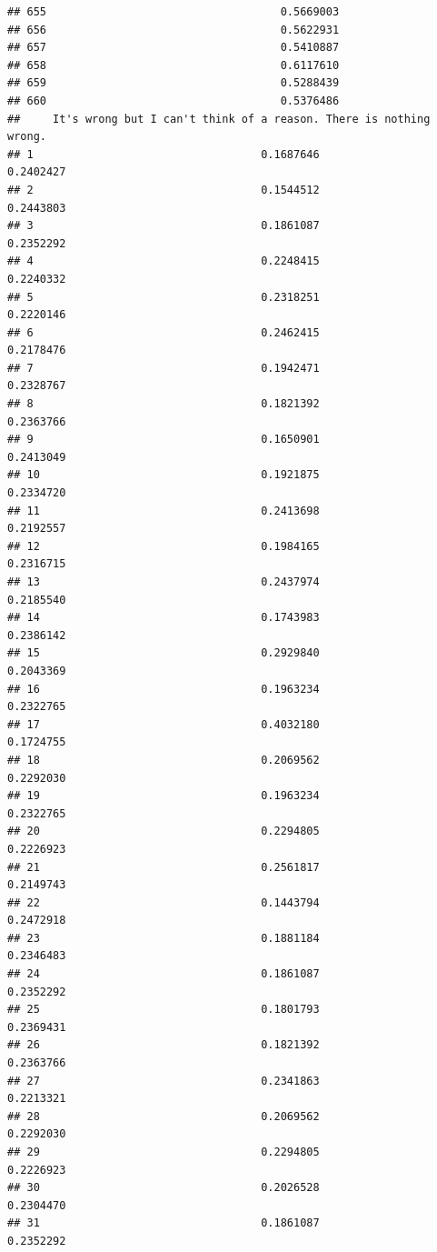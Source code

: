 \documentclass[
  american,
  man,floatsintext]{apa7}
\begin{document}
\begin{verbatim}
## 655                                    0.5669003
## 656                                    0.5622931
## 657                                    0.5410887
## 658                                    0.6117610
## 659                                    0.5288439
## 660                                    0.5376486
##     It's wrong but I can't think of a reason. There is nothing wrong.
## 1                                   0.1687646               0.2402427
## 2                                   0.1544512               0.2443803
## 3                                   0.1861087               0.2352292
## 4                                   0.2248415               0.2240332
## 5                                   0.2318251               0.2220146
## 6                                   0.2462415               0.2178476
## 7                                   0.1942471               0.2328767
## 8                                   0.1821392               0.2363766
## 9                                   0.1650901               0.2413049
## 10                                  0.1921875               0.2334720
## 11                                  0.2413698               0.2192557
## 12                                  0.1984165               0.2316715
## 13                                  0.2437974               0.2185540
## 14                                  0.1743983               0.2386142
## 15                                  0.2929840               0.2043369
## 16                                  0.1963234               0.2322765
## 17                                  0.4032180               0.1724755
## 18                                  0.2069562               0.2292030
## 19                                  0.1963234               0.2322765
## 20                                  0.2294805               0.2226923
## 21                                  0.2561817               0.2149743
## 22                                  0.1443794               0.2472918
## 23                                  0.1881184               0.2346483
## 24                                  0.1861087               0.2352292
## 25                                  0.1801793               0.2369431
## 26                                  0.1821392               0.2363766
## 27                                  0.2341863               0.2213321
## 28                                  0.2069562               0.2292030
## 29                                  0.2294805               0.2226923
## 30                                  0.2026528               0.2304470
## 31                                  0.1861087               0.2352292

\end{verbatim}
\end{document}
